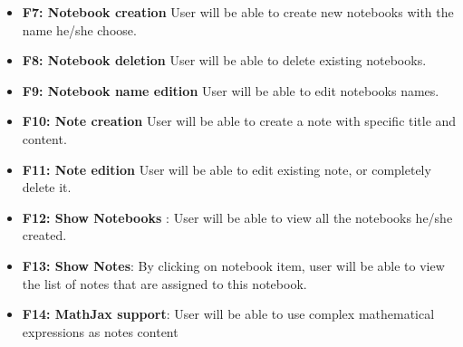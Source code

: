 \documentclass[thesis=B,english]{FITthesis}[2012/10/20]
\begin{document}
\begin{itemize}
	\item \textbf{F7: Notebook creation} User will be able to create new notebooks with the name he/she choose.
	\item \textbf{F8: Notebook deletion} User will be able to delete existing notebooks.
	\item \textbf{F9: Notebook name edition} User will be able to edit notebooks names.
	\item \textbf{F10: Note creation} User will be able to create a note with specific title and content.
	\item \textbf{F11: Note edition} User will be able to edit existing note, or completely delete it.
	\item \textbf{F12: Show Notebooks} : User will be able to view all the notebooks he/she created.
	\item \textbf{F13: Show Notes}: By clicking on notebook item, user will be able to view the list of notes that are assigned to this notebook.
	\item \textbf{F14: MathJax support}: User will be able to use complex mathematical expressions as notes content
\end{itemize}
\end{document}
